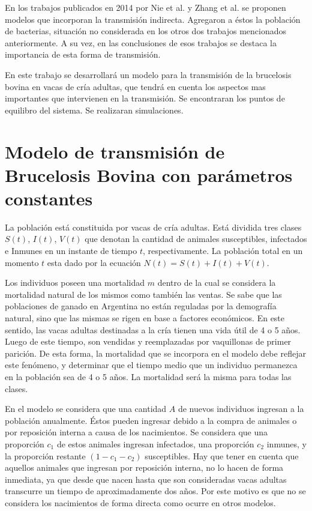 \documentclass[12pt,preprint,times]{elsarticle}
\begin{document}
En los trabajos publicados en 2014 por Nie et al. \cite{nie2014} y Zhang et al.   \cite{zhang2014prediction} se proponen modelos que incorporan la transmisión indirecta. Agregaron a éstos  la población de bacterias, situación no considerada en los otros dos trabajos mencionados anteriormente. A su vez, en las conclusiones de esos trabajos se destaca la importancia de esta forma de transmisión. 

En este trabajo  se desarrollará un modelo para la transmisión de la brucelosis bovina en vacas de cría adultas, que tendrá en cuenta los aspectos mas importantes que intervienen en la transmisión. Se encontraran los puntos de equilibro del sistema. Se realizaran simulaciones. 



\section{Modelo de transmisión de Brucelosis Bovina con parámetros constantes}\label{chapter:Modelo_Cte_brucelosis}

La población está constituida por  vacas de cría adultas. Está dividida tres clases $S(t)$, $I(t)$, $V(t)$ que denotan la cantidad de animales susceptibles, infectados  e Inmunes en un instante de tiempo $t$, respectivamente. La población total en un momento $t$ esta dado por la ecuación $N(t)= S(t)+I(t)+ V(t)$.

Los individuos poseen una mortalidad $m$ dentro de la cual se considera la mortalidad natural de los mismos como también las ventas. Se sabe que las poblaciones de ganado en Argentina no están reguladas por la demografía natural, sino que las mismas se rigen en base a factores económicos. En este sentido, las vacas adultas destinadas a la cría tienen una vida útil de 4 o 5 años. Luego de este tiempo, son vendidas y reemplazadas por vaquillonas de primer parición. De esta forma, la mortalidad que se incorpora en el modelo debe reflejar este fenómeno, y determinar que el tiempo medio que un individuo permanezca en la población sea de 4 o 5 años. La mortalidad será la misma para todas las clases.

En el modelo se considera que una cantidad $A$ de nuevos individuos ingresan a la población  anualmente. Éstos pueden ingresar debido a la compra de animales o por reposición interna a causa de los nacimientos. Se considera que una proporción $c_1$ de estos animales ingresan infectados, una proporción $c_2$ inmunes, y la proporción restante $(1-c_1-c_2)$ susceptibles. Hay que tener en cuenta que aquellos animales que ingresan por reposición interna, no lo hacen de forma inmediata, ya que desde que nacen hasta que son consideradas vacas adultas transcurre un tiempo de aproximadamente dos años. Por este motivo es que no se considera los nacimientos de forma directa como ocurre en otros modelos. 
\end{document}
